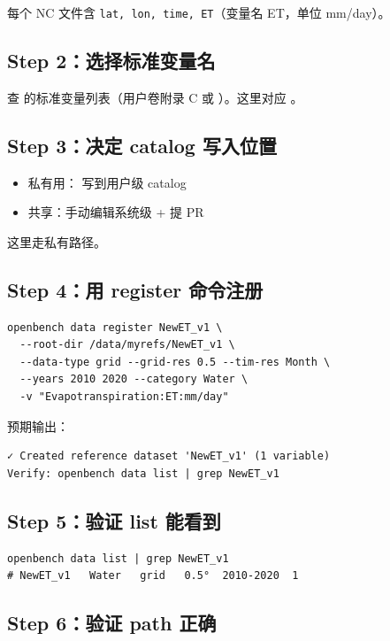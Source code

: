 每个 NC 文件含 \texttt{lat, lon, time, ET}（变量名 ET，单位 mm/day）。

\subsection{Step 2：选择标准变量名}

查 \openbench{} 的标准变量列表（用户卷附录 C 或 ）。这里对应 。

\subsection{Step 3：决定 catalog 写入位置}

\begin{itemize}
  \item 私有用： 写到用户级 catalog
  \item 共享：手动编辑系统级  + 提 PR
\end{itemize}

这里走私有路径。

\subsection{Step 4：用 register 命令注册}

\begin{verbatim}
openbench data register NewET_v1 \
  --root-dir /data/myrefs/NewET_v1 \
  --data-type grid --grid-res 0.5 --tim-res Month \
  --years 2010 2020 --category Water \
  -v "Evapotranspiration:ET:mm/day"
\end{verbatim}

预期输出：

\begin{verbatim}
✓ Created reference dataset 'NewET_v1' (1 variable)
Verify: openbench data list | grep NewET_v1
\end{verbatim}

\subsection{Step 5：验证 list 能看到}

\begin{verbatim}
openbench data list | grep NewET_v1
# NewET_v1   Water   grid   0.5°  2010-2020  1
\end{verbatim}

\subsection{Step 6：验证 path 正确}


